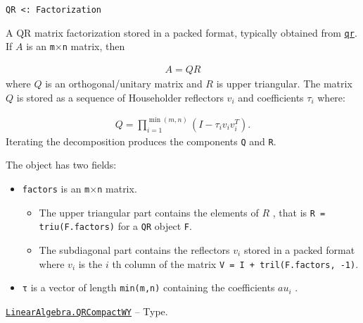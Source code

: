 \begin{adjustwidth}{2em}{0pt}


\begin{verbatim}
QR <: Factorization
\end{verbatim}

A QR matrix factorization stored in a packed format, typically obtained from \hyperlink{4122539696772350360}{\texttt{qr}}. If  \(A\)  is an \texttt{m}×\texttt{n} matrix, then

\begin{equation*}
\begin{split}A = Q R\end{split}\end{equation*}
where  \(Q\)  is an orthogonal/unitary matrix and  \(R\)  is upper triangular. The matrix  \(Q\)  is stored as a sequence of Householder reflectors  \(v_i\)  and coefficients  \(\tau_i\)  where:

\begin{equation*}
\begin{split}Q = \prod_{i=1}^{\min(m,n)} (I - \tau_i v_i v_i^T).\end{split}\end{equation*}
Iterating the decomposition produces the components \texttt{Q} and \texttt{R}.

The object has two fields:

\begin{itemize}
\item \texttt{factors} is an \texttt{m}×\texttt{n} matrix.

\begin{itemize}
\item The upper triangular part contains the elements of  \(R\) , that is \texttt{R = triu(F.factors)} for a \texttt{QR} object \texttt{F}.


\item The subdiagonal part contains the reflectors  \(v_i\)  stored in a packed format where  \(v_i\)  is the  \(i\) th column of the matrix \texttt{V = I + tril(F.factors, -1)}.

\end{itemize}

\item \texttt{τ} is a vector  of length \texttt{min(m,n)} containing the coefficients  \(au_i\) .

\end{itemize}


\end{adjustwidth}
\hypertarget{15814215390089782499}{}
\hyperlink{15814215390089782499}{\texttt{LinearAlgebra.QRCompactWY}}  -- {Type.}

